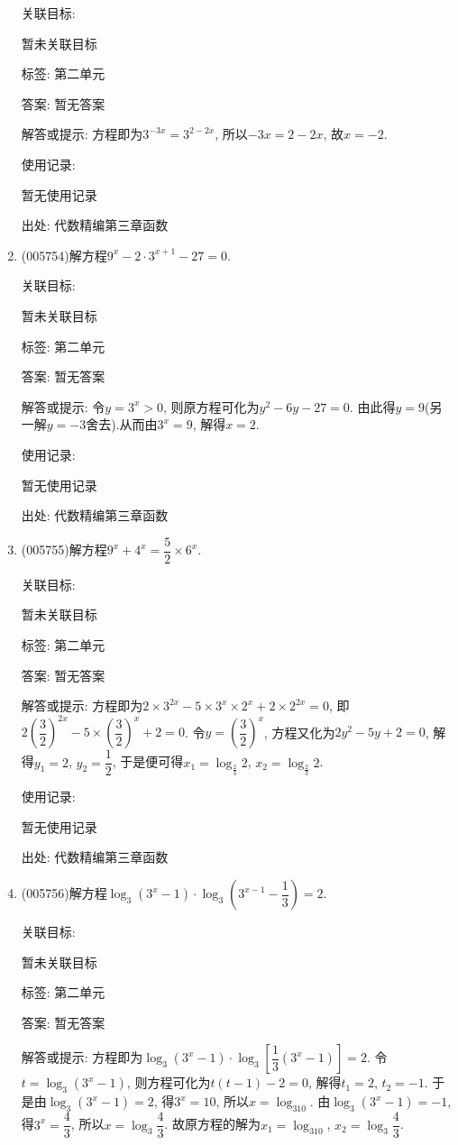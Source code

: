 \documentclass[10pt,a4paper]{article}
\begin{document}
\begin{enumerate}[1.]
关联目标:

暂未关联目标



标签: 第二单元

答案: 暂无答案

解答或提示: 方程即为$3^{-3x}=3^{2-2x}$, 所以$ -3x=2-2x$, 故$x=-2$.

使用记录:

暂无使用记录


出处: 代数精编第三章函数
\item { (005754)}解方程$9^x-2\cdot 3^{x+1}-27=0$.


关联目标:

暂未关联目标



标签: 第二单元

答案: 暂无答案

解答或提示: 令$y=3^x>0$, 则原方程可化为$y^2-6y-27=0$.
由此得$y=9$(另一解$y=-3$舍去).从而由$3^x=9$, 解得$x=2$.

使用记录:

暂无使用记录


出处: 代数精编第三章函数
\item { (005755)}解方程$9^x+4^x=\dfrac 52\times 6^x$.


关联目标:

暂未关联目标



标签: 第二单元

答案: 暂无答案

解答或提示: 方程即为$2\times 3^{2x}-5\times 3^x\times 2^x+2\times 2^{2x}=0$, 即$2(\dfrac 32)^{2x}-5\times (\dfrac 32)^x+2=0$.
令$y=(\dfrac 32)^x$, 方程又化为$2y^2-5y+2=0$, 解得$y_1=2$, $y_2=\dfrac 12$,
于是便可得$x_1=\log_{\frac 23}2$, $x_2=\log_{\frac 23}2$.

使用记录:

暂无使用记录


出处: 代数精编第三章函数
\item { (005756)}解方程$\log_3(3^x-1)\cdot \log_3(3^{x-1}-\dfrac 13)=2$.


关联目标:

暂未关联目标



标签: 第二单元

答案: 暂无答案

解答或提示: 方程即为$\log_3(3^x-1)\cdot \log_3[\dfrac 13(3^x-1)]=2$.
令$t=\log_3(3^x-1)$, 则方程可化为$t(t-1)-2=0$, 解得$t_1=2$, $t_2=-1$.
于是由$\log_3(3^x-1)=2$, 得$3^x=10$, 所以$ x=\log_310$.
由$\log_3(3^x-1)=-1$, 得$3^x=\dfrac 43$, 所以$ x=\log_3\dfrac 43$.
故原方程的解为$x_1=\log_310$, $x_2=\log_3\dfrac 43$.


\end{enumerate}
\end{document}
